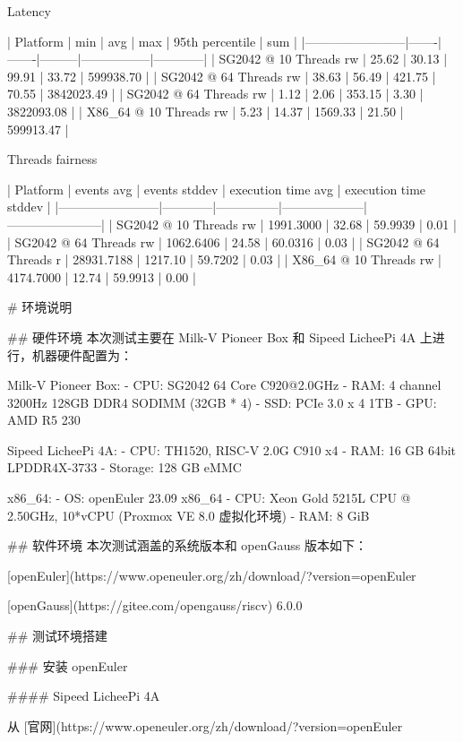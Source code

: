 \documentclass{article}
\begin{document}
\begin{markdown}
Latency

| Platform               | min   | avg   | max     | 95th percentile | sum        |
|------------------------|-------|-------|---------|-----------------|------------|
| SG2042 @ 10 Threads rw | 25.62 | 30.13 | 99.91   | 33.72           | 599938.70  |
| SG2042 @ 64 Threads rw | 38.63 | 56.49 | 421.75  | 70.55           | 3842023.49 |
| SG2042 @ 64 Threads rw | 1.12  | 2.06  | 353.15  | 3.30            | 3822093.08 |
| X86_64 @ 10 Threads rw | 5.23  | 14.37 | 1569.33 | 21.50           | 599913.47  |


Threads fairness

| Platform               | events avg | events stddev | execution time avg | execution time stddev |
|------------------------|------------|---------------|--------------------|-----------------------|
| SG2042 @ 10 Threads rw | 1991.3000  | 32.68         | 59.9939            | 0.01                  |
| SG2042 @ 64 Threads rw | 1062.6406  | 24.58         | 60.0316            | 0.03                  |
| SG2042 @ 64 Threads r  | 28931.7188 | 1217.10       | 59.7202            | 0.03                  |
| X86_64 @ 10 Threads rw | 4174.7000  | 12.74         | 59.9913            | 0.00                  |


# 环境说明

## 硬件环境
本次测试主要在 Milk-V Pioneer Box 和 Sipeed LicheePi 4A 上进行，机器硬件配置为：

Milk-V Pioneer Box:
- CPU: SG2042 64 Core C920@2.0GHz
- RAM: 4 channel 3200Hz 128GB DDR4 SODIMM (32GB * 4)
- SSD: PCIe 3.0 x 4 1TB
- GPU: AMD R5 230

Sipeed LicheePi 4A:
- CPU: TH1520, RISC-V 2.0G C910 x4
- RAM: 16 GB 64bit LPDDR4X-3733
- Storage: 128 GB eMMC

x86_64:
- OS: openEuler 23.09 x86_64
- CPU: Xeon Gold 5215L CPU @ 2.50GHz, 10*vCPU (Proxmox VE 8.0 虚拟化环境)
- RAM: 8 GiB

## 软件环境
本次测试涵盖的系统版本和 openGauss 版本如下：

[openEuler](https://www.openeuler.org/zh/download/?version=openEuler%

[openGauss](https://gitee.com/opengauss/riscv) 6.0.0

## 测试环境搭建

### 安装 openEuler

#### Sipeed LicheePi 4A

从 [官网](https://www.openeuler.org/zh/download/?version=openEuler%


\end{markdown}
\end{document}

